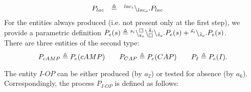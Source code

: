 \[\begin{array}{lcl@{\qquad}lcl}
 P_{lac}&\defeq&\link{lac_i}{lac_o}.P_{lac}
\end{array}\]
For the entities always produced (i.e. not present only at the first step), we  provide a  parametric
definition  
$P_e(s) \triangleq  {}^{s_i}\backslash_{s_o}^{\scriptstyle {\square}}\backslash_{\scriptstyle {\square}}^{\tilde{s}_i}\backslash_{\tilde{s}_o}.P_e(s) +  {}^{\tilde{s_i}}\backslash_{\tilde{s}_o} .P_e(s) $.\\
 There are three entities of the second type:  $$P_{cAMP}\triangleq P_e(cAMP) \qquad P_{CAP} \triangleq P_e(CAP)\qquad P_I \triangleq P_e(I).$$


The entity $I\textrm{-}OP$ can be either produced (by $a_2$) or tested for absence (by $a_6$).
Correspondingly, the process  $P_{I\textrm{-}OP}$ is defined as follows:


